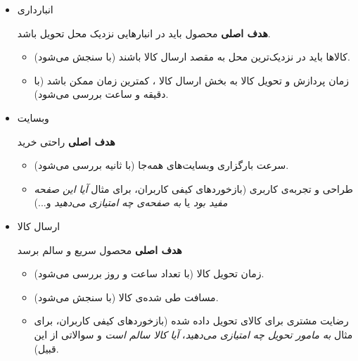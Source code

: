 \documentclass[12pt]{article}
\begin{document}
\begin{itemize}
    \item  انبارداری 
    
    \textbf{هدف اصلی} محصول باید در انبار‌هایی نزدیک محل تحویل باشد.
    \begin{itemize}
        \item 
        کالا‌ها باید در نزدیک‌ترین محل به مقصد ارسال کالا باشند (با سنجش می‌شود).
        
        \item 
        زمان پردازش و تحویل کالا به بخش ارسال کالا ، کمترین زمان ممکن باشد (با دقیقه و ساعت بررسی می‌شود).        
    \end{itemize}
    
    \item وبسایت  
    
    \textbf{هدف اصلی} راحتی خرید
    \begin{itemize}
        \item سرعت بارگزاری وبسایت‌های  همه‌جا (با ثانیه بررسی می‌شود).
        
        \item 
        طراحی و تجربه‌ی کاربری  (بازخورد‌های کیفی کاربران، برای مثال \textit{آیا این صفحه مفید بود} یا \textit{به صفحه‌ی  چه امتیازی می‌دهید} و...)
    \end{itemize}

    \item ارسال کالا 
    
    \textbf{هدف اصلی} محصول سریع و سالم برسد
    \begin{itemize}
        \item 
        زمان تحویل کالا (با تعداد ساعت و روز بررسی می‌شود).
        \item 
        مسافت طی شده‌ی کالا (با  سنجش می‌شود).
        
        \item 
        رضایت مشتری برای کالای تحویل داده شده (بازخورد‌های کیفی کاربران، برای مثال 
        \textit{به مامور تحویل چه امتیازی می‌دهید}،
        \textit{آیا کالا سالم است} و سوالاتی از این قبیل).
    \end{itemize}
\end{itemize}
\end{document}
